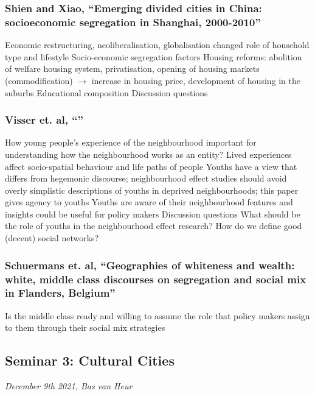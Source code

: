 \documentclass{article}
\begin{document}
\subsubsection{Shien and Xiao, ``Emerging divided cities in China: socioeconomic segregation in Shanghai, 2000-2010''}
\begin{outline}
	\1 Economic restructuring, neoliberalisation, globalisation changed role of household type and lifestyle
	\1 	Socio-economic segregation factors
		\2 Housing reforms: abolition of welfare housing system, privatisation, opening of housing markets (commodification) $\rightarrow$ increase in housing price, development of housing in the suburbs
		\2 Educational composition
	\1 Discussion questions
		\2 
\end{outline}


\subsubsection{Visser et. al, ``''}
\begin{outline}
	\1 How young people's experience of the neighbourhood important for understanding how the neighbourhood works as an entity?
		\2 Lived experiences affect socio-spatial behaviour and life paths of people 
		\2 Youths have a view that differs from hegemonic discourse; neighbourhood effect studies should avoid overly simplistic descriptions of youths in deprived neighbourhoods; this paper gives agency to youths 
		\2 Youths are aware of their neighbourhood features and insights could be useful for policy makers
	\1 Discussion questions
		\2 What should be the role of youths in the neighbourhood effect research?
		\2 How do we define good (decent) social networks?
\end{outline}

\subsubsection{Schuermans et. al, ``Geographies of whiteness and wealth: white, middle class discourses on segregation and social mix in Flanders, Belgium''}
\begin{outline}
	\1 Is the middle class ready and willing to assume the role that policy makers assign to them through their social mix strategies
\end{outline}


\subsection{Seminar 3: Cultural Cities}
\textit{December 9th 2021, Bas van Heur}
\end{document}
